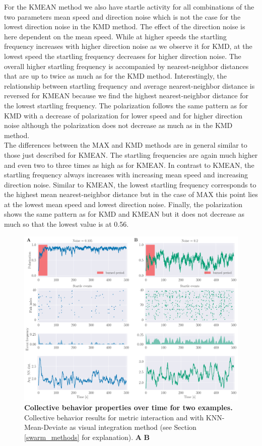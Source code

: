 \documentclass[a4paper,10pt,hidelinks]{scrreprt}
\begin{document}
    For the KMEAN method we also have startle activity for all combinations of the two parameters mean speed and direction noise which is not the case for the lowest direction noise in the KMD method.
    The effect of the direction noise is here dependent on the mean speed.
    While at higher speeds the startling frequency increases with higher direction noise as we observe it for KMD, at the lowest speed the startling frequency decreases for higher direction noise.
    The overall higher startling frequency is accompanied by nearest-neighbor distances that are up to twice as much as for the KMD method.
    Interestingly, the relationship between startling frequency and average nearest-neighbor distance is reversed for KMEAN because we find the highest nearest-neighbor distance for the lowest startling frequency.
    The polarization follows the same pattern as for KMD with a decrease of polarization for lower speed and for higher direction noise although the polarization does not decrease as much as in the KMD method.\\
    The differences between the MAX and KMD methods are in general similar to those just described for KMEAN.
    The startling frequencies are again much higher and even two to three times as high as for KMEAN.
    In contrast to KMEAN, the startling frequency always increases with increasing mean speed and increasing direction noise.
    Similar to KMEAN, the lowest startling frequency corresponds to the highest mean nearest-neighbor distance but in the case of MAX this point lies at the lowest mean speed and lowest direction noise.
    Finally, the polarization shows the same pattern as for KMD and KMEAN but it does not decrease as much so that the lowest value is at 0.56.    
    \begin{figure}[H]
    \begin{center}
    \includegraphics[width=\textwidth]{looming_swarm_over_time.pdf}
    \end{center}
    \caption{\textbf{Collective behavior properties over time for two examples.} Collective behavior results for metric interaction and with KNN-Mean-Deviate as visual integration method (see Section \ref{swarm_methods} for explanation). \textbf{A} \textbf{B} }
    \label{fig:swarm_over_time}
    \end{figure}
    
\end{document}
